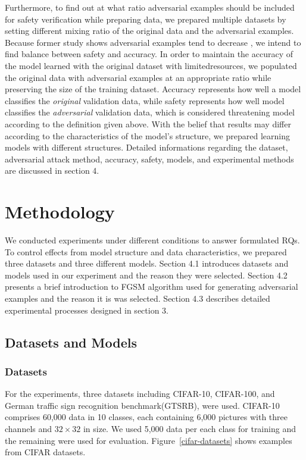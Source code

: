 \documentclass[symmetry,article,submit,moreauthors,pdftex]{Definitions/mdpi}
\begin{document}
Furthermore, to find out at what ratio adversarial examples should be included for safety verification while preparing data, we prepared multiple datasets by setting different mixing ratio of the original data and the adversarial examples.
Because former study shows adversarial examples tend to decrease \cite{trade-off}, we intend to find balance between safety and accuracy.
In order to maintain the accuracy of the model learned with the original dataset with limitedresources, we populated the original data with adversarial examples at an appropriate ratio while preserving the size of the training dataset.
Accuracy represents how well a model classifies the {\it original} validation data, while safety represents how well model classifies the {\it adversarial} validation data, which is considered threatening model according to the definition given above.
With the belief that results may differ according to the characteristics of the model's structure, we prepared learning models with different structures. 
Detailed informations regarding the dataset, adversarial attack method, accuracy, safety, models, and experimental methods are discussed in section 4.

\section{Methodology}

We conducted experiments under different conditions to answer formulated RQs. To control effects from model structure and data characteristics, we prepared three datasets and three different models.
Section 4.1 introduces datasets and models used in our experiment and the reason they were selected.
Section 4.2 presents a brief introduction to FGSM algorithm used for generating adversarial examples and the reason it is was selected.
Section 4.3 describes detailed experimental processes designed in section 3.

\subsection{Datasets and Models}

\subsubsection{Datasets}

For the experiments, three datasets including CIFAR-10, CIFAR-100\cite{cifar}, and German traffic sign recognition benchmark(GTSRB)\cite{gtsrb}, were used.
CIFAR-10 comprises 60,000 data in 10 classes, each containing 6,000 pictures with three channels and \begin{math}{32\times 32}\end{math} in size.
We used 5,000 data per each class for training and the remaining were used for evaluation.
Figure~\ref{cifar-datasets} shows examples from CIFAR datasets.
\end{document}
